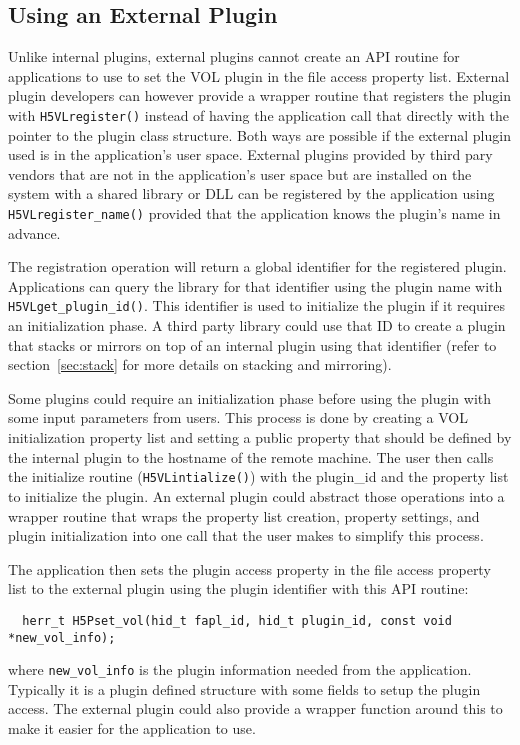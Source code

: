 \subsection{Using an External Plugin}
Unlike internal plugins, external plugins cannot create an API routine for applications to use to set the VOL plugin in the file access property list. External plugin developers can however provide a wrapper routine that registers the plugin with {\tt H5VLregister()} instead of having the application call that directly with the pointer to the plugin class structure. Both ways are possible if the external plugin used is in the application's user space. External plugins provided by third pary vendors that are not in the application's user space but are installed on the system with a shared library or DLL can be registered by the application using {\tt H5VLregister\_name()} provided that the application knows the plugin's name in advance.

The registration operation will return a global identifier for the registered plugin. Applications can query the library for that identifier using the plugin name with {\tt H5VLget\_plugin\_id()}. This identifier is used to initialize the plugin if it requires an initialization phase. A third party library could use that ID to create a plugin that stacks or mirrors on top of an internal plugin using that identifier (refer to section~\ref{sec:stack} for more details on stacking and mirroring).

Some plugins could require an initialization phase before using the plugin with some input parameters from users. This process is done by creating a VOL initialization property list and setting a public property that should be defined by the internal plugin to the hostname of the remote machine. The user then calls the initialize routine ({\tt H5VLintialize()}) with the plugin\_id and the property list to initialize the plugin. An external plugin could abstract those operations into a wrapper routine that wraps the property list creation, property settings, and plugin initialization into one call that the user makes to simplify this process.

The application then sets the plugin access property in the file access property list to the external plugin using the plugin identifier with this API routine:
\begin{lstlisting}
  herr_t H5Pset_vol(hid_t fapl_id, hid_t plugin_id, const void *new_vol_info);
\end{lstlisting}
where {\tt new\_vol\_info} is the plugin information needed from the application. Typically it is a plugin defined structure with some fields to setup the plugin access. The external plugin could also provide a wrapper function around this to make it easier for the application to use. 

